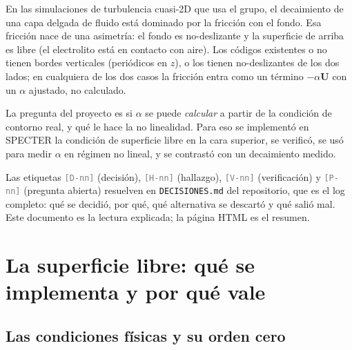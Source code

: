 \documentclass[11pt,a4paper]{article}
\newcommand{\etq}[1]{\textcolor{gray}{\texttt{[#1]}}}
\begin{document}
En las simulaciones de turbulencia cuasi-2D que usa el grupo, el decaimiento de una capa
delgada de fluido está dominado por la fricción con el fondo. Esa fricción nace de una
asimetría: el fondo es no-deslizante y la superficie de arriba es libre (el electrolito
está en contacto con aire). Los códigos existentes o no tienen bordes verticales
(periódicos en $z$), o los tienen no-deslizantes de los dos lados; en cualquiera de los dos
casos la fricción entra como un término $-\alpha\boldsymbol U$ con un $\alpha$ ajustado, no
calculado.

La pregunta del proyecto es si $\alpha$ se puede \emph{calcular} a partir de la condición
de contorno real, y qué le hace la no linealidad. Para eso se implementó en SPECTER
\cite{fontana2020} la condición de superficie libre en la cara superior, se verificó, se
usó para medir $\alpha$ en régimen no lineal, y se contrastó con un decaimiento medido.

Las etiquetas \etq{D-nn} (decisión), \etq{H-nn} (hallazgo), \etq{V-nn} (verificación) y
\etq{P-nn} (pregunta abierta) resuelven en \texttt{DECISIONES.md} del repositorio, que es
el log completo: qué se decidió, por qué, qué alternativa se descartó y qué salió mal.
Este documento es la lectura explicada; la página HTML es el resumen.

\section{La superficie libre: qué se implementa y por qué vale}
\label{sec:superficie}

\subsection{Las condiciones físicas y su orden cero}
\end{document}
